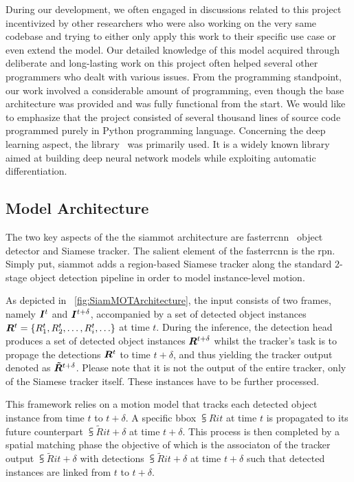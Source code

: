 During our development, we often engaged in discussions related to this project incentivized by other researchers who were also working on the very same codebase and trying to either only apply this work to their specific use case or even extend the model. Our detailed knowledge of this model acquired through deliberate and long-lasting work on this project often helped several other programmers who dealt with various issues. From the programming standpoint, our work involved a considerable amount of programming, even though the base architecture was provided and was fully functional from the start. We would like to emphasize that the project consisted of several thousand lines of source code programmed purely in Python programming language. Concerning the deep learning aspect, the \pytorch{} library~\cite{paszke2019pytorch} was primarily used. It is a widely known library aimed at building deep neural network models while exploiting automatic differentiation.

\subsection{Model Architecture}

The two key aspects of the the \gls{siammot} architecture are \gls{fasterrcnn}~\cite{ren2017fasterrcnn} object detector and Siamese tracker. The salient element of the \gls{fasterrcnn} is the \gls{rpn}. Simply put, \gls{siammot} adds a region-based Siamese tracker along the standard $2$-stage object detection pipeline in order to model instance-level motion.

As depicted in \figtext{}~\ref{fig:SiamMOTArchitecture}, the input consists of two frames, namely $\bm{I}^{t}$ and $\bm{I}^{t + \delta}$, accompanied by a set of detected object instances $\bm{R}^{t} = \left\{ {{R}_{1}^{t}, {R}_{2}^{t}, \dots, {R}_{i}^{t}, \dots} \right\}$ at time $t$. During the inference, the detection head produces a set of detected object instances $\bm{R}^{t + \delta}$ whilst the tracker's task is to propage the detections $\bm{R}^{t}$ to time $t + \delta$, and thus yielding the tracker output denoted as $\bm{\tilde{R}}^{t + \delta}$. Please note that it is not the output of the entire tracker, only of the Siamese tracker itself. These instances have to be further processed.

This framework relies on a motion model that tracks each detected object instance from time $t$ to $t + \delta$. A specific \gls{bbox} $\subsup{R}{i}{t}$ at time $t$ is propagated to its future counterpart $\subsup{\tilde{R}}{i}{t + \delta}$ at time $t + \delta$. This process is then completed by a spatial matching phase the objective of which is the associaton of the tracker output $\subsup{\tilde{R}}{i}{t + \delta}$ with detections $\subsup{\tilde{R}}{i}{t + \delta}$ at time $t + \delta$ such that detected instances are linked from $t$ to $t + \delta$.

